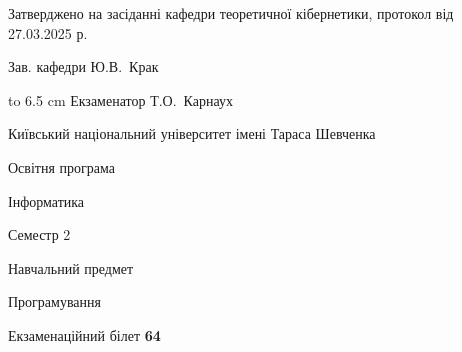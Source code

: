 \documentclass[12pt, ukrainian]{article}
\begin{document}
{\smallskip\smallskip \begin {scriptsize} Затверджено на засіданні кафедри теоретичної кібернетики, протокол   від   27.03.2025 р.\par\smallskip\smallskip\smallskip\smallskip
{\parbox {6.5 cm} {Зав. кафедри \dotfill Ю.В.~Крак}}\hspace {0.7cm} {\hbox to 6.5 cm { Екзаменатор \dotfill Т.О.~Карнаух}} \end{scriptsize}}
\newpage
{{\begin {scriptsize}\par
{ \center  Київський національний університет імені Тараса Шевченка \par}
{\parbox {5 cm}{Освітня програма \hfill}{\parbox {7 cm}{Інформатика\hfill}}\parbox {6 cm}{\hfill Семестр 2}}\par
{\parbox {5 cm} {Навчальний предмет \hfill}\parbox {7 cm}{Програмування \hfill}\parbox {6cm}{\hfill}\par}\vspace{-15pt} \end{scriptsize}}{\center Екзаменаційний білет \No \textbf { 64 }\par}}
\end{document}
